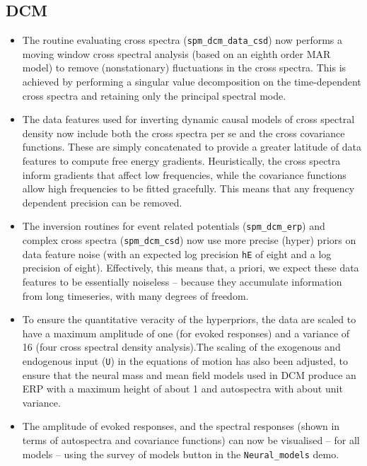 \documentclass[a4paper,titlepage,openany]{article}
\begin{document}
\begin{multicols}{2}
\subsection{DCM}

\begin{itemize}
\item The routine evaluating cross spectra (\texttt{spm\_dcm\_data\_csd}) now performs a moving window cross spectral analysis (based on an eighth order MAR model) to remove (nonstationary) fluctuations in the cross spectra. This is achieved by performing a singular value decomposition on the time-dependent cross spectra and retaining only the principal spectral mode.
\item The data features used for inverting dynamic causal models of cross spectral density now include both the cross spectra per se and the cross covariance functions. These are simply concatenated to provide a greater latitude of data features to compute free energy gradients. Heuristically, the cross spectra inform gradients that affect low frequencies, while the covariance functions allow high frequencies to be fitted gracefully. This means that any frequency dependent precision can be removed.
\item The inversion routines for event related potentials (\texttt{spm\_dcm\_erp}) and complex cross spectra (\texttt{spm\_dcm\_csd}) now use more precise (hyper) priors on data feature noise (with an expected log precision \texttt{hE} of eight and a log precision of eight). Effectively, this means that, a priori, we expect these data features to be essentially noiseless -- because they accumulate information from long timeseries, with many degrees of freedom.
\item To ensure the quantitative veracity of the hyperpriors, the data are scaled to have a maximum amplitude of one (for evoked responses) and a variance of 16 (four cross spectral density analysis).The scaling of the exogenous and endogenous input (\texttt{U}) in the equations of motion has also been adjusted, to ensure that the neural mass and mean field models used in DCM produce an ERP with a maximum height of about 1 and autospectra with about unit variance.
\item The amplitude of evoked responses, and the spectral responses (shown in terms of autospectra and covariance functions) can now be visualised -- for all models -- using the survey of models button in the \texttt{Neural\_models} demo.
\end{itemize}


\end{multicols}
\end{document}
